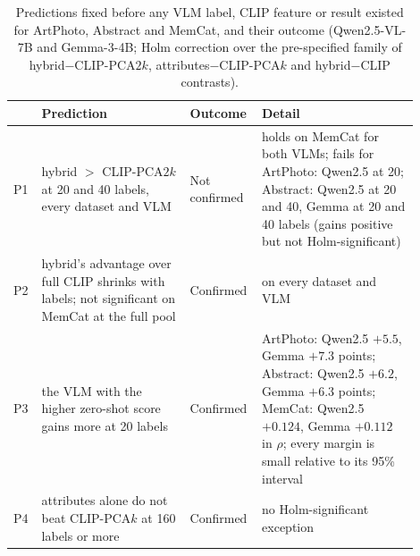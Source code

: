 \begin{table}[t]
\centering
\caption{Predictions fixed before any VLM label, CLIP feature or result existed for ArtPhoto, Abstract and MemCat, and their outcome (Qwen2.5-VL-7B and Gemma-3-4B; Holm correction over the pre-specified family of hybrid$-$CLIP-PCA$2k$, attributes$-$CLIP-PCA$k$ and hybrid$-$CLIP contrasts).}
\label{tab:prereg}
\small
\begin{tabular}{@{}>{\raggedright\arraybackslash}p{0.05\linewidth}>{\raggedright\arraybackslash}p{0.35\linewidth}>{\raggedright\arraybackslash}p{0.13\linewidth}>{\raggedright\arraybackslash}p{0.37\linewidth}@{}}
\toprule
& Prediction & Outcome & Detail \\
\midrule
P1 & hybrid $>$ CLIP-PCA$2k$ at 20 and 40 labels, every dataset and VLM & Not confirmed & holds on MemCat for both VLMs; fails for ArtPhoto: Qwen2.5 at 20; Abstract: Qwen2.5 at 20 and 40, Gemma at 20 and 40 labels (gains positive but not Holm-significant) \\
P2 & hybrid's advantage over full CLIP shrinks with labels; not significant on MemCat at the full pool & Confirmed & on every dataset and VLM \\
P3 & the VLM with the higher zero-shot score gains more at 20 labels & Confirmed & ArtPhoto: Qwen2.5 $+5.5$, Gemma $+7.3$ points; Abstract: Qwen2.5 $+6.2$, Gemma $+6.3$ points; MemCat: Qwen2.5 $+0.124$, Gemma $+0.112$ in $\rho$; every margin is small relative to its 95\% interval \\
P4 & attributes alone do not beat CLIP-PCA$k$ at 160 labels or more & Confirmed & no Holm-significant exception \\
\bottomrule
\end{tabular}
\end{table}
